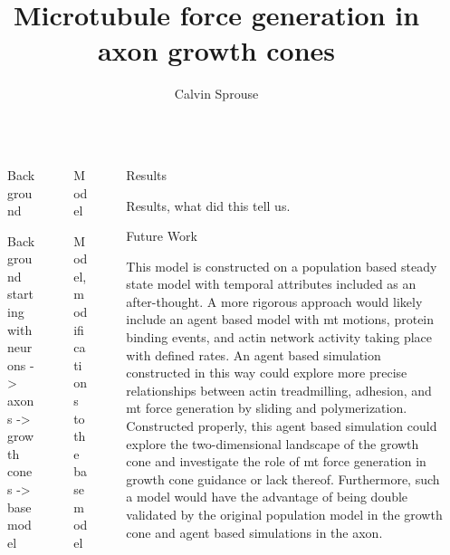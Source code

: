 \documentclass[final]{beamer}
\title{Microtubule force generation in axon growth cones}
\author{Calvin Sprouse}
\institute[CWU]{Department of Physics, Central Washington University}
\newlength{\sepwidth}
\newlength{\colwidth}
\newcommand{\separatorcolumn}{\begin{column}{\sepwidth}\end{column}}
\begin{document}
\begin{frame}[t]
\begin{columns}[t]
\separatorcolumn%


\begin{column}{\colwidth}

\begin{block}{Background}
\end{block}

Background starting with neurons -> axons -> growth cones -> base model

\end{column}
\separatorcolumn%


\begin{column}{\colwidth}

\begin{block}{Model}

Model, modifications to the base model

\end{block}

\end{column}
\separatorcolumn%


\begin{column}{\colwidth}

\begin{block}{Results}

Results, what did this tell us.

\end{block}

\begin{block}{Future Work}

This model is constructed on a population based steady state model with temporal attributes included as an after-thought. A more rigorous approach would likely include an agent based model with mt motions, protein binding events, and actin network activity taking place with defined rates. An agent based simulation constructed in this way could explore more precise relationships between actin treadmilling, adhesion, and mt force generation by sliding and polymerization. Constructed properly, this agent based simulation could explore the two-dimensional landscape of the growth cone and investigate the role of mt force generation in growth cone guidance or lack thereof. Furthermore, such a model would have the advantage of being double validated by the original population model in the growth cone and agent based simulations in the axon.


\end{block}
\end{column}
\end{columns}
\end{frame}
\end{document}
